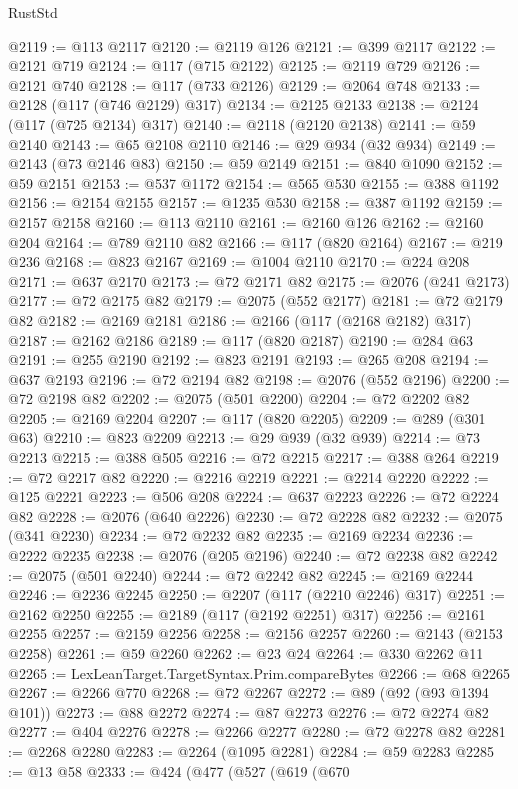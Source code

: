 \begin{lexlean}{RustStd}
\begin{coremodule}
@2119 := @113 @2117
@2120 := @2119 @126
@2121 := @399 @2117
@2122 := @2121 @719
@2124 := @117 (@715 @2122)
@2125 := @2119 @729
@2126 := @2121 @740
@2128 := @117 (@733 @2126)
@2129 := @2064 @748
@2133 := @2128 (@117 (@746 @2129) @317)
@2134 := @2125 @2133
@2138 := @2124 (@117 (@725 @2134) @317)
@2140 := @2118 (@2120 @2138)
@2141 := @59 @2140
@2143 := @65 @2108 @2110
@2146 := @29 @934 (@32 @934)
@2149 := @2143 (@73 @2146 @83)
@2150 := @59 @2149
@2151 := @840 @1090
@2152 := @59 @2151
@2153 := @537 @1172
@2154 := @565 @530
@2155 := @388 @1192
@2156 := @2154 @2155
@2157 := @1235 @530
@2158 := @387 @1192
@2159 := @2157 @2158
@2160 := @113 @2110
@2161 := @2160 @126
@2162 := @2160 @204
@2164 := @789 @2110 @82
@2166 := @117 (@820 @2164)
@2167 := @219 @236
@2168 := @823 @2167
@2169 := @1004 @2110
@2170 := @224 @208
@2171 := @637 @2170
@2173 := @72 @2171 @82
@2175 := @2076 (@241 @2173)
@2177 := @72 @2175 @82
@2179 := @2075 (@552 @2177)
@2181 := @72 @2179 @82
@2182 := @2169 @2181
@2186 := @2166 (@117 (@2168 @2182) @317)
@2187 := @2162 @2186
@2189 := @117 (@820 @2187)
@2190 := @284 @63
@2191 := @255 @2190
@2192 := @823 @2191
@2193 := @265 @208
@2194 := @637 @2193
@2196 := @72 @2194 @82
@2198 := @2076 (@552 @2196)
@2200 := @72 @2198 @82
@2202 := @2075 (@501 @2200)
@2204 := @72 @2202 @82
@2205 := @2169 @2204
@2207 := @117 (@820 @2205)
@2209 := @289 (@301 @63)
@2210 := @823 @2209
@2213 := @29 @939 (@32 @939)
@2214 := @73 @2213
@2215 := @388 @505
@2216 := @72 @2215
@2217 := @388 @264
@2219 := @72 @2217 @82
@2220 := @2216 @2219
@2221 := @2214 @2220
@2222 := @125 @2221
@2223 := @506 @208
@2224 := @637 @2223
@2226 := @72 @2224 @82
@2228 := @2076 (@640 @2226)
@2230 := @72 @2228 @82
@2232 := @2075 (@341 @2230)
@2234 := @72 @2232 @82
@2235 := @2169 @2234
@2236 := @2222 @2235
@2238 := @2076 (@205 @2196)
@2240 := @72 @2238 @82
@2242 := @2075 (@501 @2240)
@2244 := @72 @2242 @82
@2245 := @2169 @2244
@2246 := @2236 @2245
@2250 := @2207 (@117 (@2210 @2246) @317)
@2251 := @2162 @2250
@2255 := @2189 (@117 (@2192 @2251) @317)
@2256 := @2161 @2255
@2257 := @2159 @2256
@2258 := @2156 @2257
@2260 := @2143 (@2153 @2258)
@2261 := @59 @2260
@2262 := @23 @24
@2264 := @330 @2262 @11
@2265 := LexLeanTarget.TargetSyntax.Prim.compareBytes
@2266 := @68 @2265
@2267 := @2266 @770
@2268 := @72 @2267
@2272 := @89 (@92 (@93 @1394 @101))
@2273 := @88 @2272
@2274 := @87 @2273
@2276 := @72 @2274 @82
@2277 := @404 @2276
@2278 := @2266 @2277
@2280 := @72 @2278 @82
@2281 := @2268 @2280
@2283 := @2264 (@1095 @2281)
@2284 := @59 @2283
@2285 := @13 @58
@2333 := @424
    (@477
      (@527
        (@619
          (@670

\end{coremodule}
\end{lexlean}
